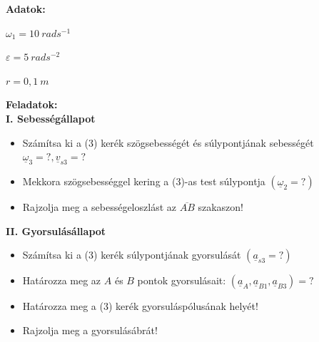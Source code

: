 \begin{tcolorbox}[colback=MidnightBlue!5!white,colframe=MidnightBlue!60!black,title= 2. Feladat{,} hajtómű sebesség és gyorsulásállapot]
        \textbf{Adatok:}
    \begin{center}
        \begin{multicols}{3}
            \(\omega_1 = 10\ rads^{-1}\)
    
            \columnbreak
    
            \(\varepsilon = 5\ rads^{-2}\)
    
            \columnbreak
    
            \(r = 0,1\ m\)
        \end{multicols}
    \end{center}
    \textbf{Feladatok:}\\
    \textbf{I. Sebességállapot}
    \begin{itemize}
        \item Számítsa ki a (3) kerék szögsebességét és súlypontjának sebességét \(\underline{\omega}_3 = ?, \underline{v}_{s3} = ?\)
        \item Mekkora szögsebességgel kering a (3)-as test súlypontja \((\underline{\omega}_2 = ?)\)
        \item Rajzolja meg a sebességeloszlást az \(\overline{AB} \) szakaszon!
    \end{itemize}
    \textbf{II. Gyorsulásállapot}
    \begin{itemize}
        \item Számítsa ki a (3) kerék súlypontjának gyorsulását \((\underline{a}_{s3} = ?)\)
        \item Határozza meg az \(A\) és \(B\) pontok gyorsulásait: \((\underline{a}_A, \underline{a}_{B1}, \underline{a}_{B3}) = ?\)
        \item Határozza meg a (3) kerék gyorsuláspólusának helyét!
        \item Rajzolja meg a gyorsulásábrát!
    \end{itemize}

\end{tcolorbox}